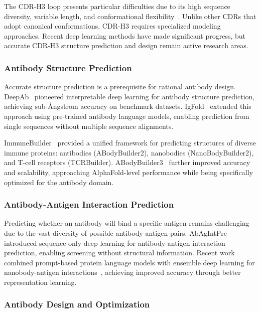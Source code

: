 The CDR-H3 loop presents particular difficulties due to its high sequence diversity, variable length, and conformational flexibility~\cite{alford2017rosettaantibody}. Unlike other CDRs that adopt canonical conformations, CDR-H3 requires specialized modeling approaches. Recent deep learning methods have made significant progress, but accurate CDR-H3 structure prediction and design remain active research areas.

\subsubsection{Antibody Structure Prediction}

Accurate structure prediction is a prerequisite for rational antibody design. DeepAb~\cite{ruffolo2022deepab} pioneered interpretable deep learning for antibody structure prediction, achieving sub-{\AA}ngstrom accuracy on benchmark datasets. IgFold~\cite{ruffolo2023igfold} extended this approach using pre-trained antibody language models, enabling prediction from single sequences without multiple sequence alignments.

ImmuneBuilder~\cite{abanades2023immunebuilder} provided a unified framework for predicting structures of diverse immune proteins: antibodies (ABodyBuilder2), nanobodies (NanoBodyBuilder2), and T-cell receptors (TCRBuilder). ABodyBuilder3~\cite{henry2024abodybuilder3} further improved accuracy and scalability, approaching AlphaFold-level performance while being specifically optimized for the antibody domain.

\subsubsection{Antibody-Antigen Interaction Prediction}

Predicting whether an antibody will bind a specific antigen remains challenging due to the vast diversity of possible antibody-antigen pairs. AbAgIntPre~\cite{li2022abagintpre} introduced sequence-only deep learning for antibody-antigen interaction prediction, enabling screening without structural information. Recent work combined prompt-based protein language models with ensemble deep learning for nanobody-antigen interactions~\cite{zhang2024nanobody}, achieving improved accuracy through better representation learning.

\subsubsection{Antibody Design and Optimization}

